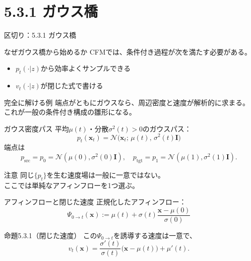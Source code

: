 \section{5.3.1 ガウス橋}
\asmain
\begin{frame}{区切り：5.3.1 ガウス橋}
    \tableofcontents[currentsection]
\end{frame}
\asmain
\begin{frame}{なぜガウス橋から始めるか}
    CFMでは、条件付き過程が次を満たす必要がある。
    \begin{itemize}
        \item $p_t(\cdot|z)$から効率よくサンプルできる
        \item $v_t(\cdot|z)$が閉じた式で書ける
    \end{itemize}
    \begin{block}{完全に解ける例}
        端点がともにガウスなら、周辺密度と速度が解析的に求まる。\\
        これが一般の条件付き構成の雛形になる。
    \end{block}
\end{frame}
\asmain
\begin{frame}{ガウス密度パス}
    平均$\mu(t)$・分散$\sigma^{2}(t)>0$のガウスパス：
    \[
        p_t(\bm{x}_t)
        =
        \mathcal{N}\!\bigl(\bm{x}_t;\,\mu(t),\,\sigma^{2}(t)\bm{I}\bigr)
        \tag{5.3.1}
    \]
    端点は
    \[
        p_{\mathrm{src}}=p_0=\mathcal{N}(\mu(0),\sigma^{2}(0)\bm{I}),
        \quad
        p_{\mathrm{tgt}}=p_1=\mathcal{N}(\mu(1),\sigma^{2}(1)\bm{I}).
    \]
    \begin{exampleblock}{注意}
        同じ$\{p_t\}$を生む速度場は一般に一意ではない。\\
        ここでは単純なアフィンフローを1つ選ぶ。
    \end{exampleblock}
\end{frame}
\asmain
\begin{frame}{アフィンフローと閉じた速度}
    正規化したアフィンフロー：
    \[
        \Psi_{0\to t}(\bm{x})
        :=
        \mu(t)+\sigma(t)\dfrac{\bm{x}-\mu(0)}{\sigma(0)}
        \tag{5.3.2}
    \]
    \begin{block}{命題5.3.1（閉じた速度）}
        この$\Psi_{0\to t}$を誘導する速度は一意で、
        \[
            v_t(\bm{x})
            =
            \dfrac{\sigma'(t)}{\sigma(t)}\bigl(\bm{x}-\mu(t)\bigr)
            +
            \mu'(t).
        \]
    \end{block}
\end{frame}
